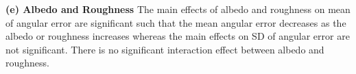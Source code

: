 
\textbf{(e) Albedo and Roughness} 
The main effects of albedo and roughness on mean of angular error are significant such that the mean angular error decreases as the albedo or roughness increases whereas the main effects on SD of angular error are not significant. There is no significant interaction effect between albedo and roughness.

